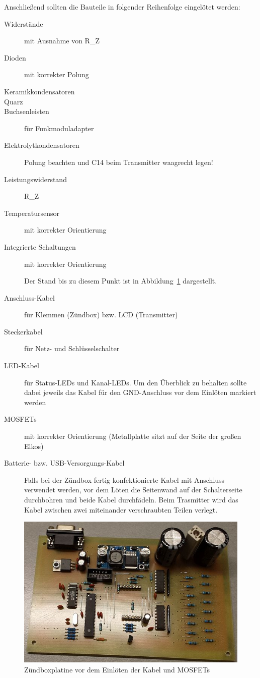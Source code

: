 \documentclass[pdftex, parskip, numbers=noenddot, toc=listof]{scrbook}
\begin{document}
	Anschließend sollten die Bauteile in folgender Reihenfolge eingelötet werden:
	\begin{description}
		\item[Widerstände] mit Ausnahme von R\_Z
		\item[Dioden] mit korrekter Polung
		\item[Keramikkondensatoren]
		\item[Quarz]
		\item[Buchsenleisten] für Funkmoduladapter
		\item[Elektrolytkondensatoren] Polung beachten und C14 beim Transmitter waagrecht legen!
		\item[Leistungswiderstand] R\_Z
		\item[Temperatursensor] mit korrekter Orientierung
		\item[Integrierte Schaltungen] mit korrekter Orientierung
		\begin{center}
			Der Stand bis zu diesem Punkt ist in Abbildung~\ref{fig:platinenzwischenschritt} dargestellt.
		\end{center}
		\item[Anschluss-Kabel] für Klemmen (Zündbox) bzw. LCD (Transmitter)
		\item[Steckerkabel] für Netz- und Schlüsselschalter
		\item[LED-Kabel] für Status-LEDs und Kanal-LEDs. Um den Überblick zu behalten sollte dabei jeweils das Kabel für den GND-Anschluss vor dem Einlöten markiert werden
		\item[MOSFETs] mit korrekter Orientierung (Metallplatte sitzt auf der Seite der großen Elkos)
		\item[Batterie- bzw. USB-Versorgungs-Kabel] Falls bei der Zündbox fertig konfektionierte Kabel mit Anschluss verwendet werden, vor dem Löten die Seitenwand auf der Schalterseite durchbohren und beide Kabel durchfädeln. Beim Trasmitter wird das Kabel zwischen zwei miteinander verschraubten Teilen verlegt.
	\end{description}

	\begin{figure}
		\centering
		\includegraphics[width=\textwidth]{bilder/platinenzwischenschritt}
		\caption{Zündboxplatine vor dem Einlöten der Kabel und MOSFETs}
		\label{fig:platinenzwischenschritt}
	\end{figure}
\end{document}
